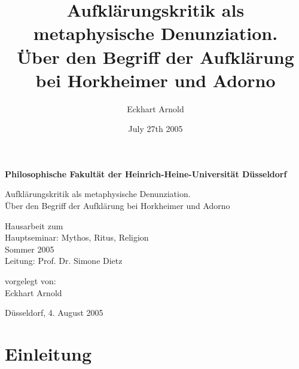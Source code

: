 \documentclass[12pt,a4paper,ngerman]{article}
\begin{document}

\title{Aufklärungskritik als metaphysische Denunziation.\\ 
       Über den Begriff der Aufklärung bei Horkheimer und Adorno}

\author{Eckhart Arnold}
\date{July 27th 2005}

\begin{titlepage}

\begin{center}
\noindent
{\bf Philosophische Fakultät der Heinrich-Heine-Universität Düsseldorf}

\vspace{5cm}

\noindent
{\Large Aufklärungskritik als metaphysische Denunziation.\\
Über den Begriff der Aufklärung bei Horkheimer und Adorno}

\vspace{7cm}
\end{center}

\begin{flushleft}

\noindent
Hausarbeit zum\\
Hauptseminar: Mythos, Ritus, Religion\\
Sommer 2005\\
Leitung: Prof. Dr. Simone Dietz

\vspace{1cm}
\noindent
vorgelegt von:\\
Eckhart Arnold

\vspace{1cm}
\noindent
Düsseldorf, 4. August 2005
\end{flushleft}

\end{titlepage}

\fontsize{12}{18}
\selectfont

\tableofcontents

\newpage

\setcounter{page}{1}

\section{Einleitung}
\end{document}
